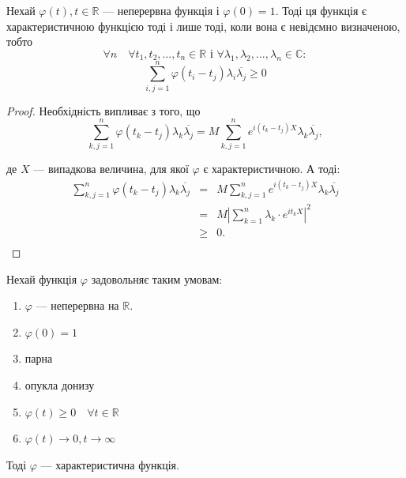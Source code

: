\begin{theorem}
    Нехай $\varphi(t), t \in \mathbb{R}$ --- неперервна функція
    і $\varphi(0) = 1$.
    Тоді ця функція є характеристичною функцією тоді
    і лише тоді, коли вона є невідємно визначеною,
    тобто
    $$\forall n \quad
    \forall t_1, t_2, ..., t_n \in \mathbb{R} \text{ і }
    \forall \lambda_1, \lambda_2, ..., \lambda_n \in \mathbb{C}:$$
    \begin{equation}
        \sum\limits_{i, j = 1}^{n} \varphi(t_i - t_j) \lambda_i \overline{\lambda_j} \geqslant 0
    \end{equation}
\end{theorem}
\begin{proof}
    Необхідність випливає з того, що
    $$\sum\limits_{k, j = 1}^{n} \varphi(t_k - t_j) \lambda_k \overline{\lambda_j}
    = M \sum\limits_{k, j = 1}^{n} e^{i(t_k-t_j)X} \lambda_k \overline{\lambda_j},$$
    
    де $X$ --- випадкова величина, для якої $\varphi$
    є характеристичною. А тоді:
    $$\begin{array}{rcl}
        \sum\limits_{k, j = 1}^{n} \varphi(t_k - t_j) \lambda_k \overline{\lambda_j}
        & = & M \sum\limits_{k, j = 1}^{n} e^{i(t_k-t_j)X} \lambda_k \overline{\lambda_j} \\
        & = & M \left|\sum\limits_{k=1}^{n} \lambda_k \cdot e^{i t_k X}\right|^2 \\
        & \geqslant & 0. \\
    \end{array}$$
\end{proof}


\begin{theorem}
    Нехай функція $\varphi$ задовольняє таким умовам:
    \begin{enumerate}
        \item $\varphi$ --- неперервна на $\mathbb{R}$.
        \item $\varphi(0) = 1$
        \item парна
        \item опукла донизу
        \item $\varphi(t) \geqslant 0 \quad \forall t \in \mathbb{R}$
        \item $\varphi(t) \rightarrow 0, t \rightarrow \infty$
    \end{enumerate}
    
    Тоді $\varphi$ --- характеристична функція.
\end{theorem}

